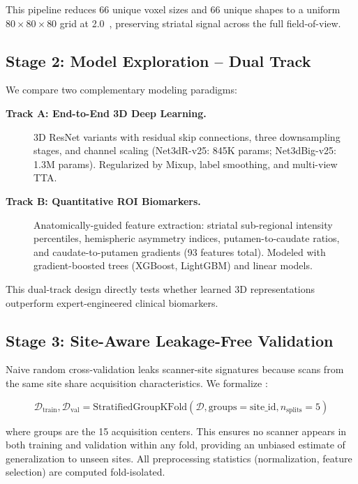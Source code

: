 This pipeline reduces 66 unique voxel sizes and 66 unique shapes to a uniform $80\times80\times80$ grid at 2.0~\voxelunit, preserving striatal signal across the full field-of-view.

\subsection{Stage 2: Model Exploration -- Dual Track}
\label{sec:framework_stage2}
We compare two complementary modeling paradigms:

\begin{description}
    \item[\textbf{Track A: End-to-End 3D Deep Learning.}] 3D ResNet variants with residual skip connections, three downsampling stages, and channel scaling (Net3dR-v25: 845K params; Net3dBig-v25: 1.3M params). Regularized by Mixup, label smoothing, and multi-view TTA.
    
    \item[\textbf{Track B: Quantitative ROI Biomarkers.}] Anatomically-guided feature extraction: striatal sub-regional intensity percentiles, hemispheric asymmetry indices, putamen-to-caudate ratios, and caudate-to-putamen gradients (93 features total). Modeled with gradient-boosted trees (XGBoost, LightGBM) and linear models.
\end{description}

This dual-track design directly tests whether learned 3D representations outperform expert-engineered clinical biomarkers.

\subsection{Stage 3: Site-Aware Leakage-Free Validation}
\label{sec:framework_stage3}
Naive random cross-validation leaks scanner-site signatures because scans from the same site share acquisition characteristics. We formalize \cvname:

\begin{equation}
    \mathcal{D}_{\text{train}}, \mathcal{D}_{\text{val}} = \text{StratifiedGroupKFold}(\mathcal{D}, \text{groups}=\text{site\_id}, n_{\text{splits}}=5)
\end{equation}

where groups are the 15 acquisition centers. This ensures no scanner appears in both training and validation within any fold, providing an unbiased estimate of generalization to unseen sites. All preprocessing statistics (normalization, feature selection) are computed fold-isolated.

